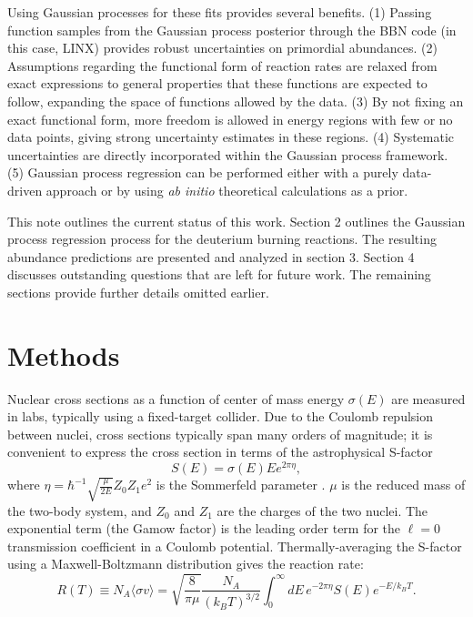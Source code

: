 \documentclass[%
 reprint,
superscriptaddress,
nofootinbib,
 amsmath,amssymb,
 aps,
 pra,
]{revtex4-2}
\begin{document}
Using Gaussian processes for these fits provides several benefits. (1) Passing function samples from the Gaussian process posterior through the BBN code (in this case, LINX) provides robust uncertainties on primordial abundances. (2) Assumptions regarding the functional form of reaction rates are relaxed from exact expressions to general properties that these functions are expected to follow, expanding the space of functions allowed by the data. (3) By not fixing an exact functional form, more freedom is allowed in energy regions with few or no data points, giving strong uncertainty estimates in these regions. (4) Systematic uncertainties are directly incorporated within the Gaussian process framework. (5) Gaussian process regression can be performed either with a purely data-driven approach or by using \textit{ab initio} theoretical calculations as a prior. 

This note outlines the current status of this work. Section 2 outlines the Gaussian process regression process for the deuterium burning reactions. The resulting abundance predictions are presented and analyzed in section 3. Section 4 discusses outstanding questions that are left for future work. The remaining sections provide further details omitted earlier. 




\section{Methods}



Nuclear cross sections as a function of center of mass energy $\sigma(E)$ are measured in labs, typically using a fixed-target collider. Due to the Coulomb repulsion between nuclei, cross sections typically span many orders of magnitude; it is convenient to express the cross section in terms of the astrophysical S-factor
\begin{equation}
	S(E) = \sigma(E) E e^{2\pi\eta},
\end{equation}
where $\eta = \hbar^{-1}\sqrt{\frac{\mu}{2E}}Z_0 Z_1 e^2$ is the Sommerfeld parameter \cite{Iliadis2015}. $\mu$ is the reduced mass of the two-body system, and $Z_0$ and $Z_1$ are the charges of the two nuclei. The exponential term (the Gamow factor) is the leading order term for the $\ell=0$ transmission coefficient in a Coulomb potential. Thermally-averaging the S-factor using a Maxwell-Boltzmann distribution gives the reaction rate:
\begin{equation}
	R(T) \equiv N_A \langle \sigma v \rangle = \sqrt{\frac{8}{\pi \mu}} \frac{N_A}{(k_B T)^{3/2}} \int_{0}^{\infty} dE \, e^{-2 \pi \eta} S(E) e^{-E/k_B T}.
\end{equation}
\end{document}
